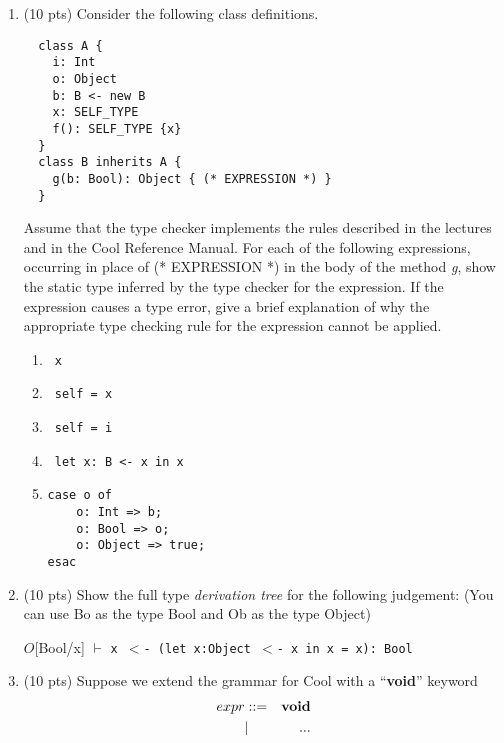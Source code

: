 \documentclass[10pt]{article}
\begin{document}
\begin{enumerate}
\item (10 pts) Consider the following class definitions.
\begin{verbatim}
  class A {
    i: Int
    o: Object
    b: B <- new B
    x: SELF_TYPE
    f(): SELF_TYPE {x}
  }
  class B inherits A {
    g(b: Bool): Object { (* EXPRESSION *) }
  }
\end{verbatim}

Assume that the type checker implements the rules described in the lectures and in the Cool Reference
Manual. For each of the following expressions, occurring in place of (* EXPRESSION *) in the body
of the method \emph{g}, show the static type inferred by the type checker for the expression. If the expression
causes a type error, give a brief explanation of why the appropriate type checking rule for the expression
cannot be applied.

\begin{enumerate}
  \item \begin{verbatim} x \end{verbatim}
  \item \begin{verbatim} self = x \end{verbatim}
  \item \begin{verbatim} self = i \end{verbatim}
  \item \begin{verbatim} let x: B <- x in x \end{verbatim}
  \item \begin{verbatim}
case o of
    o: Int => b;
    o: Bool => o;
    o: Object => true;
esac
\end{verbatim}
\end{enumerate}

\medskip

\item (10 pts) Show the full type \emph{derivation tree }for the following judgement:
(You can use Bo as the type Bool and Ob as the type Object)

\begin{center}
$O$[Bool/x] $\vdash$ \tt{x $<$- (let x:Object $<$- x in x = x): Bool}
\end{center}

\medskip
\item (10 pts) Suppose we extend the grammar for Cool with a ``{\bf void}'' keyword
\begin{eqnarray*}
  expr & ::= & {\bf void} \\
       & |   & ...
\end{eqnarray*}


\end{enumerate}
\end{document}
